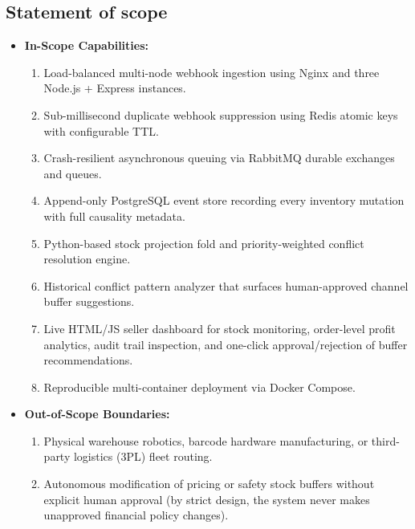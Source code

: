 \documentclass[oneside,a4paper,12pt]{report}
\begin{document}
\subsection{Statement of scope}
\begin{itemize}
  \item \textbf{In-Scope Capabilities:}
  \begin{enumerate}
    \item Load-balanced multi-node webhook ingestion using Nginx and three Node.js + Express instances.
    \item Sub-millisecond duplicate webhook suppression using Redis atomic keys with configurable TTL.
    \item Crash-resilient asynchronous queuing via RabbitMQ durable exchanges and queues.
    \item Append-only PostgreSQL event store recording every inventory mutation with full causality metadata.
    \item Python-based stock projection fold and priority-weighted conflict resolution engine.
    \item Historical conflict pattern analyzer that surfaces human-approved channel buffer suggestions.
    \item Live HTML/JS seller dashboard for stock monitoring, order-level profit analytics, audit trail inspection, and one-click approval/rejection of buffer recommendations.
    \item Reproducible multi-container deployment via Docker Compose.
  \end{enumerate}
  \item \textbf{Out-of-Scope Boundaries:}
  \begin{enumerate}
    \item Physical warehouse robotics, barcode hardware manufacturing, or third-party logistics (3PL) fleet routing.
    \item Autonomous modification of pricing or safety stock buffers without explicit human approval (by strict design, the system never makes unapproved financial policy changes).
  \end{enumerate}
\end{itemize}
\end{document}
